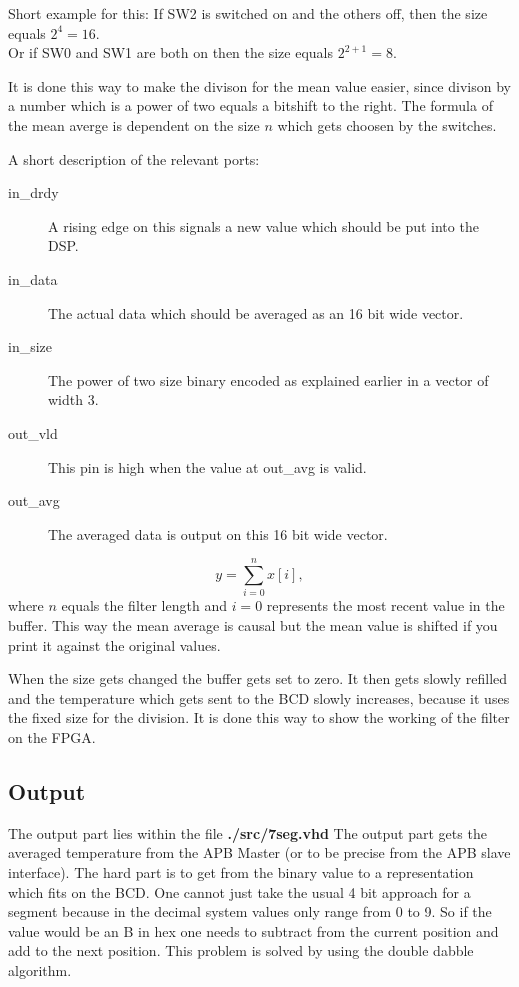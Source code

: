 \documentclass[%
	a4paper,
]
{article}
\begin{document}
Short example for this:
If SW2 is switched on and the others off, then the size equals $2^{4}=16$. \\Or if SW0 and SW1 are both on then the
size equals $2^{2+1}=8$. 


It is done this way to make the divison for the mean value easier, since
divison by a number which is a power of two equals a bitshift to the right.
The formula of the mean averge is dependent on the size $n$ which gets choosen by the switches.

A short description of the relevant ports:
\begin{description}
\item[in\_drdy] A rising edge on this signals a new value which should be put into the DSP.
\item[in\_data] The actual data which should be averaged as an 16 bit wide vector.
\item[in\_size] The power of two size binary encoded as explained earlier in a vector of width 3.
\item[out\_vld] This pin is high when the value at out\_avg is valid.
\item[out\_avg] The averaged data is output on this 16 bit wide vector.
\end{description}


\begin{equation*}
y = \sum_{i=0}^n x[i],
\end{equation*}
where $n$ equals the filter length and $i=0$ represents the most recent value in the buffer. This way the mean average is causal but the mean
value is shifted if you print it against the original values.


When the size gets changed the buffer gets set to zero. It then gets slowly refilled and the temperature
which gets sent to the BCD slowly increases, because it uses the fixed size for the division. 
It is done this way to show the working of the filter on the FPGA.

\subsection{Output}
The output part lies within the file \textbf{./src/7seg.vhd}
The output part gets the averaged temperature from the APB Master (or to be precise from the APB slave interface).
The hard part is to get from the binary value to a 
representation which fits on the BCD. One cannot just take the usual 4 bit approach for a segment 
because in the decimal system values only range from 0 to 9. So if the value would be an B in hex
one needs to subtract from the current position and add to the next position. This problem is solved
by using the double dabble algorithm.
\end{document}
